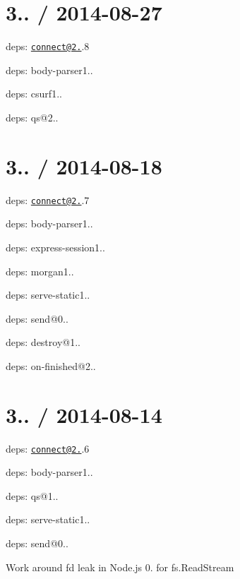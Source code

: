 \section*{3.. / 2014-\/08-\/27 }


\begin{DoxyItemize}
\item deps\+: \href{mailto:connect@2.25}{\tt connect@2.}.8
\begin{DoxyItemize}
\item deps\+: body-\/parser1..
\item deps\+: csurf1..
\item deps\+: qs@2..
\end{DoxyItemize}
\end{DoxyItemize}

\section*{3.. / 2014-\/08-\/18 }


\begin{DoxyItemize}
\item deps\+: \href{mailto:connect@2.25}{\tt connect@2.}.7
\begin{DoxyItemize}
\item deps\+: body-\/parser1..
\item deps\+: express-\/session1..
\item deps\+: morgan1..
\item deps\+: serve-\/static1..
\end{DoxyItemize}
\item deps\+: send@0..
\begin{DoxyItemize}
\item deps\+: destroy@1..
\item deps\+: on-\/finished@2..
\end{DoxyItemize}
\end{DoxyItemize}

\section*{3.. / 2014-\/08-\/14 }


\begin{DoxyItemize}
\item deps\+: \href{mailto:connect@2.25}{\tt connect@2.}.6
\begin{DoxyItemize}
\item deps\+: body-\/parser1..
\item deps\+: qs@1..
\item deps\+: serve-\/static1..
\end{DoxyItemize}
\item deps\+: send@0..
\begin{DoxyItemize}
\item Work around {\ttfamily fd} leak in Node.\+js 0. for {\ttfamily fs.\+Read\+Stream}
\end{DoxyItemize}
\end{DoxyItemize}

